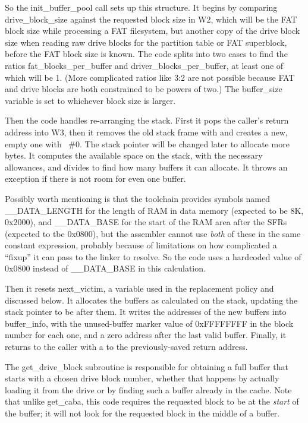 So the init\_buffer\_pool call sets up this structure.  It begins by
comparing drive\_block\_size against the requested block size in W2, which
will be the FAT block size while processing a FAT filesystem, but another
copy of the drive block size when reading raw drive blocks for the partition
table or FAT superblock, before the FAT block size is known.  The code
splits into two cases to find the ratios fat\_blocks\_per\_buffer and
driver\_blocks\_per\_buffer, at least one of which will be 1.  (More
complicated ratios like 3:2 are not possible because FAT and drive blocks
are both constrained to be powers of two.)  The buffer\_size variable is set
to whichever block size is larger.

Then the code handles re-arranging the stack.  First it pops the caller's
return address into W3, then it removes the old stack frame with 
and creates a new, empty one with ~\#0.  The stack pointer will be
changed later to allocate more bytes.  It computes the available space on
the stack, with the necessary allowances, and divides to find how many
buffers it can allocate.  It throws an exception if there is not room for
even one buffer.

Possibly worth mentioning is that the toolchain provides symbols named
\_\_DATA\_LENGTH for the length of RAM in data memory (expected to be 8K,
0x2000), and \_\_DATA\_BASE for the start of the RAM area after the SFRs
(expected to tbe 0x0800), but the assembler cannot use \emph{both} of these
in the same constant expression, probably because of limitations on how
complicated a ``fixup'' it can pass to the linker to resolve.  So the code
uses a hardcoded value of 0x0800 instead of \_\_DATA\_BASE in this
calculation.

Then it resets next\_victim, a variable used in the replacement policy and
discussed below.  It allocates the buffers as calculated on the stack,
updating the stack pointer to be after them.  It writes the addresses of the
new buffers into buffer\_info, with the unused-buffer marker value of
0xFFFFFFFF in the block number for each one, and a zero address after the
last valid buffer.  Finally, it returns to the caller with a  to
the previously-saved return address.

The get\_drive\_block subroutine is responsible for obtaining a full buffer
that starts with a chosen drive block number, whether that happens by
actually loading it from the drive or by finding such a buffer already in
the cache.  Note that unlike get\_caba, this code requires the requested
block to be at the \emph{start} of the buffer; it will not look for the
requested block in the middle of a buffer.

